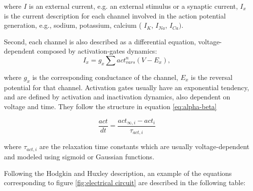 where $I$ is an external current, e.g. an external stimulus or a synaptic current, $I_{x}$ is the current description for each channel involved in the action potential generation, e.g., sodium, potassium, calcium ( $I_K$, $I_{Na}$, $I_{Ca})$.

Second, each channel is also described as a differential equation, voltage-dependent composed by activation-gates dynamics:
\begin{equation}
I_x =  g_x \sum act_{vars}^n (V - E_x), 
\end{equation}

where $g_x$ is the corresponding conductance of the channel, $E_x$ is the reversal potential for that channel.
Activation gates usually have an exponential tendency, and are defined by activation and inactivation dynamics, also dependent on voltage and time. They follow the structure in equation \ref{eq:alpha-beta}

\begin{equation}
	\label{eq:alpha-beta}
	\frac{act}{dt} = \frac{act_{\infty,i}-act_i}{\tau_{act,i}}
\end{equation}

where $\tau_{act,i}$ are the relaxation time constants which are usually voltage-dependent and modeled using sigmoid or Gaussian functions. 


Following the Hodgkin and Huxley description, an example of the equations corresponding to figure \ref{fig:electrical circuit} are described in the following table:

